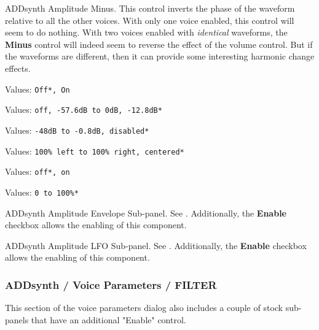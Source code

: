    \setcounter{ItemCounter}{0}      %

   ADDsynth Amplitude Minus.
   This control inverts the phase of the waveform relative to
   all the other voices.
   With only one voice enabled, this control will seem to do nothing.
   With two voices enabled with \textsl{identical} waveforms, the
   \textbf{Minus} control will indeed seem to reverse the effect of the volume
   control. But if the waveforms are different, then it can provide some
   interesting harmonic change effects.

   Values: \texttt{Off*, On}


   Values: \texttt{off, -57.6dB to 0dB, -12.8dB*}


   Values: \texttt{-48dB to -0.8dB, disabled*}


   Values: \texttt{100\% left to 100\% right, centered*}


   Values: \texttt{off*, on}


   Values: \texttt{0 to 100\%* }

   ADDsynth Amplitude Envelope Sub-panel.
   See .
   Additionally, the \textbf{Enable} checkbox allows the enabling of this
   component.

   ADDsynth Amplitude LFO Sub-panel.
   See .
   Additionally, the \textbf{Enable} checkbox allows the enabling of this
   component.

\subsubsection{ADDsynth / Voice Parameters / FILTER}
\label{subsubsec:addsynth_voice_parameters_filter}

   This section of the voice parameters dialog also includes a couple of
   stock sub-panels that have an additional "Enable" control.

